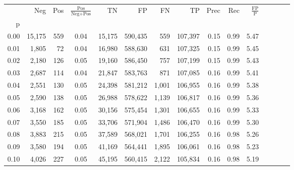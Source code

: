 \begin{tabular}{rrrcrrrrrrrrrrr}
\toprule
{} &     Neg &    Pos & $\frac{\text{Pos}}{\text{Neg}+\text{Pos}}$ &       TN &       FP &       FN &       TP &  Prec &   Rec & $\frac{\text{FP}}{\text{P}}$ \\
p    &         &        &                                            &          &          &          &          &       &       &                              \\
\midrule
0.00 &  15,175 &    559 &                                       0.04 &   15,175 &  590,435 &      559 &  107,397 &  0.15 &  0.99 &                         5.47 \\
0.01 &   1,805 &     72 &                                       0.04 &   16,980 &  588,630 &      631 &  107,325 &  0.15 &  0.99 &                         5.45 \\
0.02 &   2,180 &    126 &                                       0.05 &   19,160 &  586,450 &      757 &  107,199 &  0.15 &  0.99 &                         5.43 \\
0.03 &   2,687 &    114 &                                       0.04 &   21,847 &  583,763 &      871 &  107,085 &  0.16 &  0.99 &                         5.41 \\
0.04 &   2,551 &    130 &                                       0.05 &   24,398 &  581,212 &    1,001 &  106,955 &  0.16 &  0.99 &                         5.38 \\
0.05 &   2,590 &    138 &                                       0.05 &   26,988 &  578,622 &    1,139 &  106,817 &  0.16 &  0.99 &                         5.36 \\
0.06 &   3,168 &    162 &                                       0.05 &   30,156 &  575,454 &    1,301 &  106,655 &  0.16 &  0.99 &                         5.33 \\
0.07 &   3,550 &    185 &                                       0.05 &   33,706 &  571,904 &    1,486 &  106,470 &  0.16 &  0.99 &                         5.30 \\
0.08 &   3,883 &    215 &                                       0.05 &   37,589 &  568,021 &    1,701 &  106,255 &  0.16 &  0.98 &                         5.26 \\
0.09 &   3,580 &    194 &                                       0.05 &   41,169 &  564,441 &    1,895 &  106,061 &  0.16 &  0.98 &                         5.23 \\
0.10 &   4,026 &    227 &                                       0.05 &   45,195 &  560,415 &    2,122 &  105,834 &  0.16 &  0.98 &                         5.19 \\

\end{tabular}
